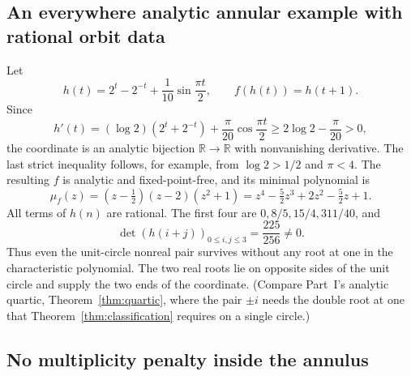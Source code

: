 \documentclass[11pt,letterpaper]{article}
\theoremstyle{definition}
\theoremstyle{remark}
\newcommand{\R}{\mathbb R}
\begin{document}
\subsection{An everywhere analytic annular example with rational orbit data}

Let
\begin{equation}
 h(t)=2^t-2^{-t}+\frac1{10}\sin\frac{\pi t}{2},
 \qquad f(h(t))=h(t+1).
 \label{nrr:sc:eq:analyticexample}
\end{equation}
Since
\[
 h'(t)=(\log2)(2^t+2^{-t})+\frac\pi{20}\cos\frac{\pi t}{2}
 \ge2\log2-\frac\pi{20}>0,
\]
the coordinate is an analytic bijection $\R\to\R$ with nonvanishing
derivative. The last strict inequality follows, for example, from
$\log2>1/2$ and $\pi<4$.
The resulting $f$ is analytic and fixed-point-free, and its minimal
polynomial is
\begin{equation}
 \mu_f(z)=(z-\tfrac12)(z-2)(z^2+1)
 =z^4-\tfrac52z^3+2z^2-\tfrac52z+1.
 \label{nrr:sc:eq:analyticpoly}
\end{equation}
All terms of $h(n)$ are rational. The first four are
$0,8/5,15/4,311/40$, and
\begin{equation}
 \det(h(i+j))_{0\le i,j\le3}=\frac{225}{256}\ne0.
 \label{nrr:sc:eq:analytichankel}
\end{equation}
Thus even the unit-circle nonreal pair survives without any root at one
in the characteristic polynomial. The two real roots lie on opposite
sides of the unit circle and supply the two ends of the coordinate.
(Compare Part~I's analytic quartic, Theorem~\ref{thm:quartic}, where the
pair $\pm i$ needs the double root at one that
Theorem~\ref{thm:classification} requires on a single circle.)

\subsection{No multiplicity penalty inside the annulus}
\end{document}
